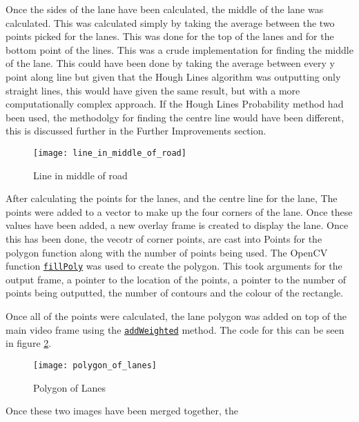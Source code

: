 \documentclass[conference]{IEEEtran}
\begin{document}
Once the sides of the lane have been calculated, the middle of the lane was calculated. This was calculated simply by taking the average between the two points picked for the lanes. This was done for the top of the lanes and for the bottom point of the lines. This was a crude implementation for finding the middle of the lane. This could have been done by taking the average between every y point along line but given that the Hough Lines algorithm was outputting only straight lines, this would have given the same result, but with a more computationally complex approach. If the Hough Lines Probability method had been used, the methodolgy for finding the centre line would have been different, this is discussed further in the Further Improvements section. 

\begin{figure}[H]
\centerline{\texttt{[image: line\_in\_middle\_of\_road]}}
\caption{Line in middle of road}
\label{fig:line_in_middle_of_road}
\end{figure}

After calculating the points for the lanes, and the centre line for the lane, The points were added to a vector to make up the four corners of the lane. Once these values have been added, a new overlay frame is created to display the lane. Once this has been done, the vecotr of corner points, are cast into Points for the polygon function along with the number of points being used. The OpenCV function \href{https://docs.opencv.org/4.x/d6/d6e/group__imgproc__draw.html#ga311160e71d37e3b795324d097cb3a7dc}{\texttt{fillPoly}} was used to create the polygon. This took arguments for the output frame, a pointer to the location of the points, a pointer to the number of points being outputted, the number of contours and the colour of the rectangle.

Once all of the points were calculated, the lane polygon was added on top of the main video frame using the \href{https://docs.opencv.org/4.x/d2/de8/group__core__array.html#gafafb2513349db3bcff51f54ee5592a19}{\texttt{addWeighted}} method. The code for this can be seen in figure \ref{fig:polygon_of_lanes}.

\begin{figure}[H]
\centerline{\texttt{[image: polygon\_of\_lanes]}}
\caption{Polygon of Lanes}
\label{fig:polygon_of_lanes}
\end{figure}

Once these two images have been merged together, the 
\end{document}
